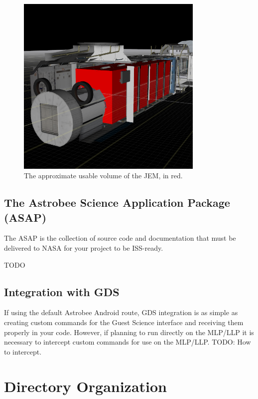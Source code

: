 \documentclass{article}
\begin{document}
\begin{figure}[h!]
	\centering
	\includegraphics[width=0.8\textwidth]{img/ISS_volume.png}
	\caption{The approximate usable volume of the JEM, in red.}
\end{figure}


\subsection{The Astrobee Science Application Package (ASAP)}

The ASAP is the collection of source code and documentation that must be delivered to NASA for your project to be ISS-ready.

TODO

\subsection{Integration with GDS}

If using the default Astrobee Android route, GDS integration is as simple as creating custom commands for the Guest Science interface and receiving them properly in your code. However, if planning to run directly on the MLP/LLP it is necessary to intercept custom commands for use on the MLP/LLP. TODO: How to intercept.



\newpage

\appendix
\section{Directory Organization}
\end{document}
